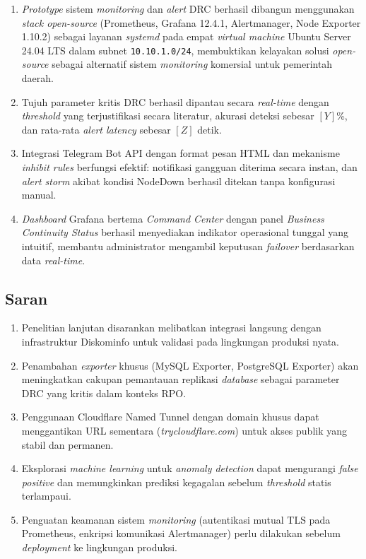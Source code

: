 \documentclass[10pt,twocolumn]{article}
\begin{document}
\begin{enumerate}[leftmargin=*, label=\arabic*.]
  \item \textit{Prototype} sistem \textit{monitoring} dan \textit{alert} DRC berhasil dibangun
        menggunakan \textit{stack open-source} (Prometheus, Grafana 12.4.1, Alertmanager, Node
        Exporter 1.10.2) sebagai layanan \textit{systemd} pada empat \textit{virtual machine} Ubuntu
        Server 24.04 LTS dalam subnet \texttt{10.10.1.0/24}, membuktikan kelayakan solusi
        \textit{open-source} sebagai alternatif sistem \textit{monitoring} komersial untuk pemerintah
        daerah.
  \item Tujuh parameter kritis DRC berhasil dipantau secara \textit{real-time} dengan
        \textit{threshold} yang terjustifikasi secara literatur, akurasi deteksi sebesar
        $[\mathit{Y}]$\%, dan rata-rata \textit{alert latency} sebesar $[\mathit{Z}]$ detik.
  \item Integrasi Telegram Bot API dengan format pesan HTML dan mekanisme \textit{inhibit rules}
        berfungsi efektif: notifikasi gangguan diterima secara instan, dan \textit{alert storm} akibat
        kondisi NodeDown berhasil ditekan tanpa konfigurasi manual.
  \item \textit{Dashboard} Grafana bertema \textit{Command Center} dengan panel \textit{Business
        Continuity Status} berhasil menyediakan indikator operasional tunggal yang intuitif, membantu
        administrator mengambil keputusan \textit{failover} berdasarkan data \textit{real-time}.
\end{enumerate}

\subsection{Saran}

\begin{enumerate}[leftmargin=*, label=\arabic*.]
  \item Penelitian lanjutan disarankan melibatkan integrasi langsung dengan infrastruktur Diskominfo
        untuk validasi pada lingkungan produksi nyata.
  \item Penambahan \textit{exporter} khusus (MySQL Exporter, PostgreSQL Exporter) akan meningkatkan
        cakupan pemantauan replikasi \textit{database} sebagai parameter DRC yang kritis dalam
        konteks RPO.
  \item Penggunaan Cloudflare Named Tunnel dengan domain khusus dapat menggantikan URL sementara
        (\textit{trycloudflare.com}) untuk akses publik yang stabil dan permanen.
  \item Eksplorasi \textit{machine learning} untuk \textit{anomaly detection} dapat mengurangi
        \textit{false positive} dan memungkinkan prediksi kegagalan sebelum \textit{threshold} statis
        terlampaui.
  \item Penguatan keamanan sistem \textit{monitoring} (autentikasi mutual TLS pada Prometheus,
        enkripsi komunikasi Alertmanager) perlu dilakukan sebelum \textit{deployment} ke lingkungan
        produksi.
\end{enumerate}
\end{document}
